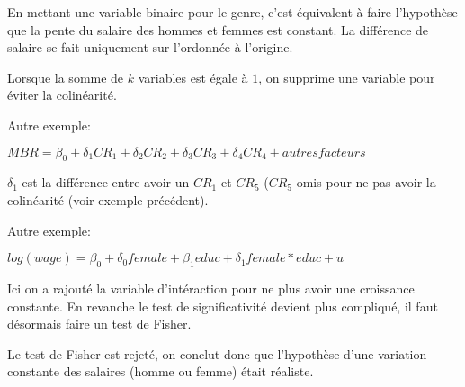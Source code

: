 \documentclass[11pt,a4paper,fleqn]{article}
\begin{document}
\vspace{5mm}

En mettant une variable binaire pour le genre, c'est équivalent à faire l'hypothèse que la pente du salaire des hommes et femmes est constant. La différence de salaire se fait uniquement sur l'ordonnée à l'origine.

Lorsque la somme de $k$ variables est égale à $1$, on supprime une variable pour éviter la colinéarité.

\vspace{5mm}

Autre exemple:

$MBR = \beta_0 + \delta_1 CR_1 + \delta_2 CR_2 + \delta_3 CR_3 +\delta_4 CR_4 + autres facteurs$

$\delta_1$ est la différence entre avoir un $CR_1$ et $CR_5$ ($CR_5$ omis pour ne pas avoir la colinéarité (voir exemple précédent).

\vspace{5mm}

Autre exemple:

$log(wage) = \beta_0 + \delta_0 female + \beta_1 educ + \delta_1 female*educ + u$

Ici on a rajouté la variable d'intéraction pour ne plus avoir une croissance constante. En revanche le test de significativité devient plus compliqué, il faut désormais faire un test de Fisher.

Le test de Fisher est rejeté, on conclut donc que l'hypothèse d'une variation constante des salaires (homme ou femme) était réaliste.
\end{document}

